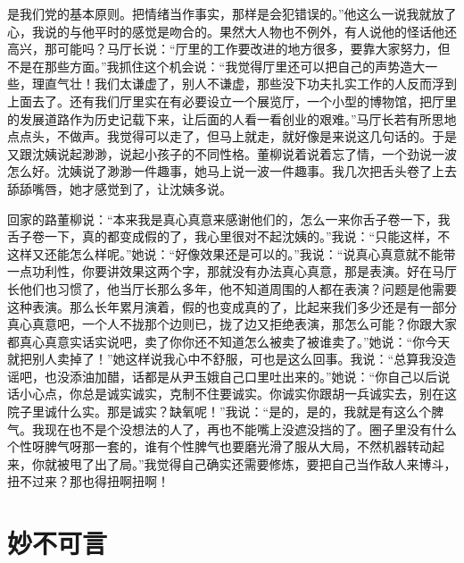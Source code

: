 \documentclass[12pt,oneside]{book}
\begin{document}
是我们党的基本原则。把情绪当作事实，那样是会犯错误的。''他这么一说我就放了心，我说的与他平时的感觉是吻合的。果然大人物也不例外，有人说他的怪话他还高兴，那可能吗？马厅长说：``厅里的工作要改进的地方很多，要靠大家努力，但不是在那些方面。''我抓住这个机会说：``我觉得厅里还可以把自己的声势造大一些，理直气壮！我们太谦虚了，别人不谦虚，那些没下功夫扎实工作的人反而浮到上面去了。还有我们厅里实在有必要设立一个展览厅，一个小型的博物馆，把厅里的发展道路作为历史记载下来，让后面的人看一看创业的艰难。''马厅长若有所思地点点头，不做声。我觉得可以走了，但马上就走，就好像是来说这几句话的。于是又跟沈姨说起渺渺，说起小孩子的不同性格。董柳说着说着忘了情，一个劲说一波怎么好。沈姨说了渺渺一件趣事，她马上说一波一件趣事。我几次把舌头卷了上去舔舔嘴唇，她才感觉到了，让沈姨多说。

回家的路董柳说：``本来我是真心真意来感谢他们的，怎么一来你舌子卷一下，我舌子卷一下，真的都变成假的了，我心里很对不起沈姨的。''我说：``只能这样，不这样又还能怎么样呢。''她说：``好像效果还是可以的。''我说：``说真心真意就不能带一点功利性，你要讲效果这两个字，那就没有办法真心真意，那是表演。好在马厅长他们也习惯了，他当厅长那么多年，他不知道周围的人都在表演？问题是他需要这种表演。那么长年累月演着，假的也变成真的了，比起来我们多少还是有一部分真心真意吧，一个人不拢那个边则已，拢了边又拒绝表演，那怎么可能？你跟大家都真心真意实话实说吧，卖了你你还不知道怎么被卖了被谁卖了。''她说：``你今天就把别人卖掉了！''她这样说我心中不舒服，可也是这么回事。我说：``总算我没造谣吧，也没添油加醋，话都是从尹玉娥自己口里吐出来的。''她说：``你自己以后说话小心点，你总是诚实诚实，克制不住要诚实。你诚实你跟胡一兵诚实去，别在这院子里诚什么实。那是诚实？缺氧呢！''我说：``是的，是的，我就是有这么个脾气。我现在也不是个没想法的人了，再也不能嘴上没遮没挡的了。圈子里没有什么个性呀脾气呀那一套的，谁有个性脾气也要磨光滑了服从大局，不然机器转动起来，你就被甩了出了局。''我觉得自己确实还需要修炼，要把自己当作敌人来博斗，扭不过来？那也得扭啊扭啊！


\chapter{妙不可言}
\end{document}
